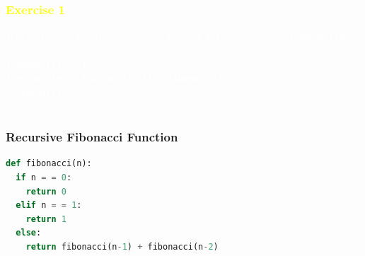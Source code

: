 \documentclass[xcolor=table,10pt,final]{beamer}
\begin{document}
{
\begin{frame}
	\frametitle{\textcolor{yellow}{Exercise 1}}
	\textcolor{white}{Write a Python function to compute the \emph{n-th Fibonacci} number.\newline\newline
	 {\tt fibonacci(0) = 0\\
	 fibonacci(1) = 1\\
	 fibonacci(n) = fibonacci(n-1) + fibonacci(n-2)}\newline\newline
	 Example: \\ {\tt > fibonacci(10)\\55}
	}
\end{frame}
}

\begin{frame}[fragile]
	\frametitle{Recursive Fibonacci Function}	
	\begin{lstlisting}[language=Python]
def fibonacci(n):
  if n = = 0:
    return 0
  elif n = = 1:
    return 1
  else:
    return fibonacci(n-1) + fibonacci(n-2)
	\end{lstlisting}
\end{frame}
\end{document}

